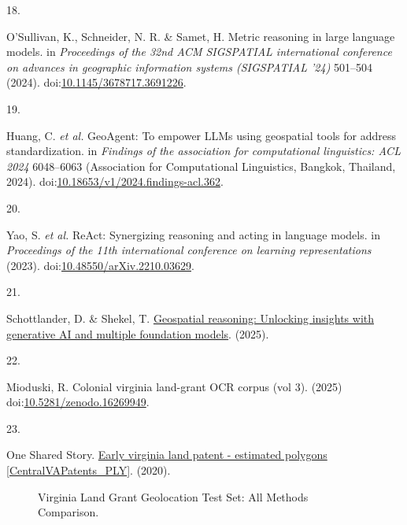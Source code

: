 \documentclass[
  10pt]{article}
\newlength{\cslhangindent}
\newlength{\csllabelwidth}
\newenvironment{CSLReferences}[2] %
 {\begin{list}{}{%
  \setlength{\itemindent}{0pt}
  \setlength{\leftmargin}{0pt}
  \setlength{\parsep}{0pt}
  \ifodd #1
   \setlength{\leftmargin}{\cslhangindent}
   \setlength{\itemindent}{-1\cslhangindent}
  \fi
  \setlength{\itemsep}{#2\baselineskip}}}
 {\end{list}}
\newcommand{\CSLLeftMargin}[1]{\parbox[t]{\csllabelwidth}{\strut#1\strut}}
\newcommand{\CSLRightInline}[1]{\parbox[t]{\linewidth - \csllabelwidth}{\strut#1\strut}}
\let\OldTexttt\texttt
\renewcommand{\texttt}[1]{%
  \OldTexttt{\begingroup\breaklines#1\endgroup}}
\begin{document}
\begin{CSLReferences}{0}{0}
\CSLLeftMargin{18. }%
\CSLRightInline{O'Sullivan, K., Schneider, N. R. \& Samet, H. Metric
reasoning in large language models. in \emph{Proceedings of the 32nd ACM
SIGSPATIAL international conference on advances in geographic
information systems (SIGSPATIAL '24)} 501--504 (2024).
doi:\href{https://doi.org/10.1145/3678717.3691226}{10.1145/3678717.3691226}.}

\CSLLeftMargin{19. }%
\CSLRightInline{Huang, C. \emph{et al.} GeoAgent: To empower LLMs using
geospatial tools for address standardization. in \emph{Findings of the
association for computational linguistics: ACL 2024} 6048--6063
(Association for Computational Linguistics, Bangkok, Thailand, 2024).
doi:\href{https://doi.org/10.18653/v1/2024.findings-acl.362}{10.18653/v1/2024.findings-acl.362}.}

\CSLLeftMargin{20. }%
\CSLRightInline{Yao, S. \emph{et al.} ReAct: Synergizing reasoning and
acting in language models. in \emph{Proceedings of the 11th
international conference on learning representations} (2023).
doi:\href{https://doi.org/10.48550/arXiv.2210.03629}{10.48550/arXiv.2210.03629}.}

\CSLLeftMargin{21. }%
\CSLRightInline{Schottlander, D. \& Shekel, T.
\href{https://research.google/blog/geospatial-reasoning-unlocking-insights-with-generative-ai-and-multiple-foundation-models/}{Geospatial
reasoning: Unlocking insights with generative AI and multiple foundation
models}. (2025).}

\CSLLeftMargin{22. }%
\CSLRightInline{Mioduski, R. Colonial virginia land-grant OCR corpus
(vol 3). (2025)
doi:\href{https://doi.org/10.5281/zenodo.16269949}{10.5281/zenodo.16269949}.}

\CSLLeftMargin{23. }%
\CSLRightInline{One Shared Story.
\href{https://www.arcgis.com/home/item.html?id=6fc329e0694b497196435beba8244a47}{Early
virginia land patent - estimated polygons {[}CentralVAPatents\_PLY{]}}.
(2020).}

\end{CSLReferences}

\begin{figure}[htbp]
  \centering
  \texttt{[image: map\_outputs/contact\_sheet.png]}
  \caption{Virginia Land Grant Geolocation Test Set: All Methods Comparison.}
  \label{fig:contacts}
\end{figure}
\end{document}
